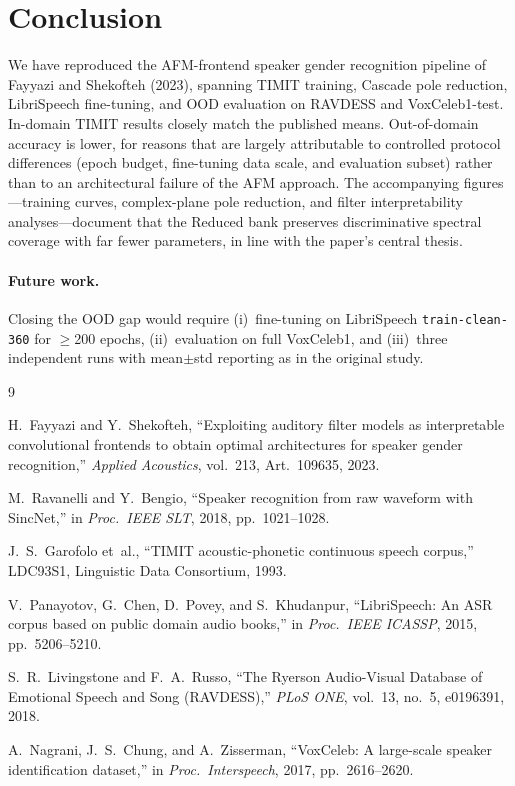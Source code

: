 \documentclass[11pt,a4paper]{article}
\begin{document}
\section{Conclusion}

We have reproduced the AFM-frontend speaker gender recognition pipeline of Fayyazi and Shekofteh (2023), spanning TIMIT training, Cascade pole reduction, LibriSpeech fine-tuning, and OOD evaluation on RAVDESS and VoxCeleb1-test. In-domain TIMIT results closely match the published means. Out-of-domain accuracy is lower, for reasons that are largely attributable to controlled protocol differences (epoch budget, fine-tuning data scale, and evaluation subset) rather than to an architectural failure of the AFM approach. The accompanying figures---training curves, complex-plane pole reduction, and filter interpretability analyses---document that the Reduced bank preserves discriminative spectral coverage with far fewer parameters, in line with the paper's central thesis.

\paragraph{Future work.}
Closing the OOD gap would require (i)~fine-tuning on LibriSpeech \texttt{train-clean-360} for $\ge$200 epochs, (ii)~evaluation on full VoxCeleb1, and (iii)~three independent runs with mean$\pm$std reporting as in the original study.

\begin{thebibliography}{9}

H.~Fayyazi and Y.~Shekofteh,
``Exploiting auditory filter models as interpretable convolutional frontends to obtain optimal architectures for speaker gender recognition,''
\emph{Applied Acoustics}, vol.~213, Art.~109635, 2023.

M.~Ravanelli and Y.~Bengio,
``Speaker recognition from raw waveform with SincNet,''
in \emph{Proc.\ IEEE SLT}, 2018, pp.~1021--1028.

J.~S.~Garofolo et~al.,
``TIMIT acoustic-phonetic continuous speech corpus,''
LDC93S1, Linguistic Data Consortium, 1993.

V.~Panayotov, G.~Chen, D.~Povey, and S.~Khudanpur,
``LibriSpeech: An ASR corpus based on public domain audio books,''
in \emph{Proc.\ IEEE ICASSP}, 2015, pp.~5206--5210.

S.~R.~Livingstone and F.~A.~Russo,
``The Ryerson Audio-Visual Database of Emotional Speech and Song (RAVDESS),''
\emph{PLoS ONE}, vol.~13, no.~5, e0196391, 2018.

A.~Nagrani, J.~S.~Chung, and A.~Zisserman,
``VoxCeleb: A large-scale speaker identification dataset,''
in \emph{Proc.\ Interspeech}, 2017, pp.~2616--2620.

\end{thebibliography}
\end{document}
